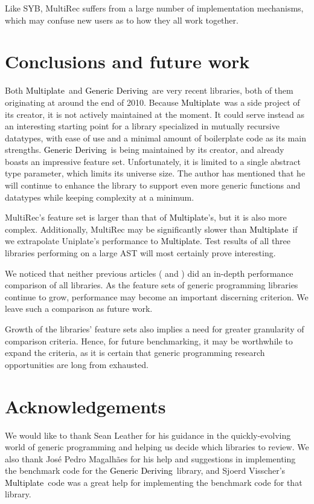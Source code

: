 \documentclass[twocolumn,11pt,a4paper]{article}
\newcommand{\multiplate}{\textcolor{black}{Multiplate}}
\newcommand{\genericderiving}{\textcolor{black}{Generic Deriving}}
\begin{document}
Like SYB, MultiRec suffers from a large number of implementation mechanisms, which may confuse new users as to how they all work together.

\section{Conclusions and future work}\label{conclusion}
Both \multiplate\ and \genericderiving\ are very recent libraries, both of them originating at around the end of 2010.
Because \multiplate\ was a side project of its creator, it is not actively maintained at the moment.
It could serve instead as an interesting starting point for a library specialized in mutually recursive datatypes, with ease of use and a minimal amount of boilerplate code as its main strengths.
\genericderiving\ is being maintained by its creator, and already boasts an impressive feature set.
Unfortunately, it is limited to a single abstract type parameter, which limits its universe size.
The author has mentioned that he will continue to enhance the library to support even more generic functions and datatypes while keeping complexity at a minimum.

MultiRec's feature set is larger than that of \multiplate's, but it is also more complex.
Additionally, MultiRec may be significantly slower than \multiplate\ if we extrapolate Uniplate's performance to \multiplate.
Test results of all three libraries performing on a large AST will most certainly prove interesting.

We noticed that neither previous articles (\citet{Rodriguez:2008:art} and \citet{Rodriguez:2009:phd}) did an in-depth performance comparison of all libraries.
As the feature sets of generic programming libraries continue to grow, performance may become an important discerning criterion.
We leave such a comparison as future work.

Growth of the libraries' feature sets also implies a need for greater granularity of comparison criteria. 
Hence, for future benchmarking, it may be worthwhile to expand the criteria, as it is certain that generic programming research opportunities are long from exhausted.

\section{Acknowledgements}
We would like to thank Sean Leather for his guidance in the quickly-evolving world of generic programming and helping us decide which libraries to review.
We also thank José Pedro Magalhães for his help and suggestions in implementing the benchmark code for the \genericderiving\ library, and Sjoerd Visscher's \multiplate\ code was a great help for implementing the benchmark code for that library.



\end{document}
